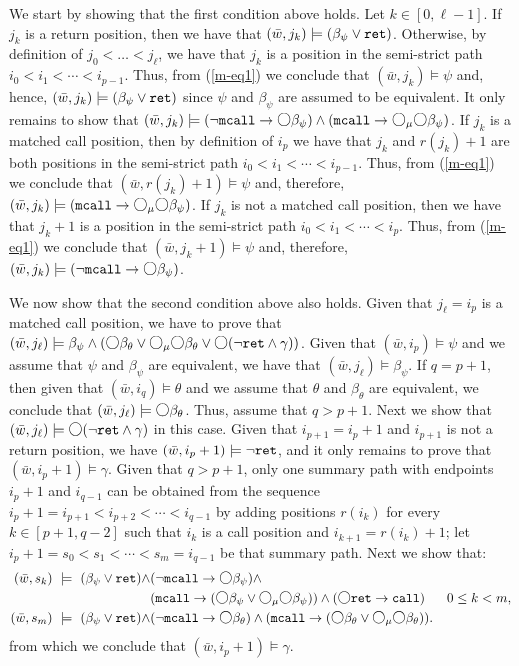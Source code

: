 \documentclass{LMCS}
\newcommand{\M}{{\mu}}
\newcommand{\w}{{\bar{w}}}
\newcommand{\dm}{\Diamond}
\newcommand{\next}{\text{\raisebox{1pt}{$\bigcirc$}}}
\theoremstyle{plain}
\theoremstyle{definition}
\newcommand{\mcall}{{\tt{mcall}}}
\newcommand{\rett}{{\tt ret}}
\newcommand{\call}{{\tt call}}
\newcommand{\dmm}{\dm_{\M}}
\renewcommand{\dm}{\next}
\renewcommand{\dmm}{\dm_\M}
\begin{document}
\begin{enumerate}[(a)]
We start by showing that the first condition above holds.  Let $k \in
[0,\ell-1]$. If $j_k$ is a return position, then we have that $(\w,
j_k) \models (\beta_\psi \vee \rett)$. Otherwise, by definition of
$j_0 < \ldots < j_\ell$, we have that $j_k$ is a position in the
semi-strict path $i_0 < i_1 <
\cdots < i_{p-1}$. Thus, from (\ref{m-eq1}) we
conclude that $(\w, j_k) \models \psi$ and, hence, $(\w, j_k) \models
(\beta_\psi \vee \rett)$ since $\psi$ and $\beta_\psi$ are assumed to
be equivalent. It only remains to show that $(\w, j_k) \models (\neg
\mcall \to \dm \beta_\psi) \wedge (\mcall \to \dmm \dm \beta_\psi)$. If
$j_k$ is a matched call position, then by definition of $i_p$ we have
that $j_k$ and $r(j_k)+1$ are both positions in the semi-strict
path $i_0 < i_1 < \cdots < i_{p-1}$. Thus, from (\ref{m-eq1}) we
conclude that $(\w, r(j_k)+1) \models \psi$ and, therefore, $(\w,j_k)
\models (\mcall \to
\dmm \dm \beta_\psi)$. If $j_k$ is not a matched call position, then we have
that $j_k+1$ is a position in the semi-strict path $i_0 < i_1
< \cdots < i_p$. Thus, from (\ref{m-eq1}) we conclude that $(\w,
j_k+1) \models \psi$ and, therefore, $(\w,j_k)
\models (\neg \mcall \to \dm \beta_\psi)$.  

We now show that the second condition above also holds. Given that
$j_\ell = i_p$ is a matched call position, we have to prove that $(\w,
j_{\ell})
\models \beta_\psi \wedge (\dm \beta_\theta \vee \dmm \dm
\beta_\theta \vee \dm (\neg \rett \wedge \gamma))$. Given that $(\w,
i_p) \models \psi$ and we assume that $\psi$ and $\beta_\psi$ are
equivalent, we have that $(\w, j_{\ell}) \models \beta_\psi$. If $q =
p+1$, then given that $(\w, i_q) \models \theta$ and we assume that
$\theta$ and $\beta_\theta$ are equivalent, we conclude that $(\w,
j_\ell) \models \dm \beta_\theta$. Thus, assume that $q > p+1$. Next we
show that $(\w, j_\ell) \models \dm (\neg \rett \wedge
\gamma)$ in this case. Given that $i_{p+1} = i_p+1$ and $i_{p+1}$ is
not a return position, we have $(\w, i_p+1) \models \neg \rett$, and it only
remains to prove that $(\w, i_p+1) \models \gamma$. Given that $q >
p+1$, only one summary
path with endpoints $i_p+1$ and $i_{q-1}$ can be obtained from the
sequence $i_p+1 = i_{p+1} < i_{p+2} < \cdots < i_{q-1}$ by adding
positions $r(i_k)$ for every $k \in [p+1,q-2]$ such that $i_k$ is a
call position and $i_{k+1} = r(i_k)+1$; let $i_p+1 = s_0 < s_1 <
\cdots < s_m = i_{q-1}$ be that summary path. Next we show that:
{\small
\begin{align*}
(\w, s_k) \ \models \ (\beta_\psi \vee \rett) \wedge & (\neg \mcall
\to \dm \beta_\psi) \wedge \\
& (\mcall \to (\dm \beta_\psi \vee \dmm \dm \beta_\psi)) \wedge (\dm \rett
\to \call) \ \ \ \ \ 0 \leq k < m,\\    
(\w, s_m) \ \models \ (\beta_\psi \vee \rett) \wedge & (\neg\mcall \to
\dm \beta_\theta) \wedge (\mcall \to (\dm \beta_\theta \vee \dmm \dm
\beta_\theta)).
\end{align*}}\noindent
from which we conclude that $(\w, i_p+1) \models \gamma$.


\end{enumerate}
\end{document}
